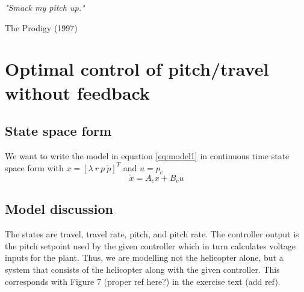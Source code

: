 \epigraph{\textit{"Smack my pitch up."}}{The Prodigy (1997)}
\section{Optimal control of pitch/travel without feedback}
\subsection{State space form}
We want to write the model in equation \ref{eq:model1} in continuous time state space form with $x = \left[ \lambda\  r\  p\  \dot{p}\right]^T$ and $u=p_c$
\begin{equation}\label{eq:model1}
\dot{x}=A_cx+B_cu
\end{equation}
\subsection{Model discussion}
The states are travel, travel rate, pitch, and pitch rate. The controller output is the pitch setpoint used by the given controller which in turn calculates voltage inputs for the plant. Thus, we are modelling not the helicopter alone, but a system that consists of the helicopter along with the given controller. This corresponds with Figure 7 (proper ref here?) in the exercise text (add ref).